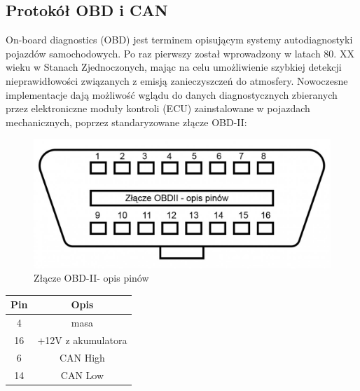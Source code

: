 \documentclass[10pt,a4paper]{scrartcl}
\begin{document}
		\subsection{Protokół OBD i CAN}
		On-board diagnostics (OBD) jest terminem opisującym systemy autodiagnostyki pojazdów samochodowych. Po raz pierwszy został wprowadzony w latach 80. XX wieku w Stanach Zjednoczonych, mając na celu umożliwienie szybkiej detekcji nieprawidłowości związanych z emisją zanieczyszczeń do atmosfery.  Nowoczesne implementacje dają możliwość wglądu do danych diagnostycznych zbieranych przez elektroniczne moduły kontroli (ECU) zainstalowane w pojazdach mechanicznych, poprzez standaryzowane złącze OBD-II:
		\begin{figure}[H]
			\centering
			\includegraphics[width=0.7\linewidth]{obd2}
			\caption[Złącze OBD-II]{Złącze OBD-II- opis pinów}
			\label{fig:obd2}
		\end{figure}
		\begin{table}[H]
		\begin{tabular}{|c|c|}
			\hline
			Pin & Opis \\
			\hline
			4 & masa \\
			\hline
			16 & +12V z akumulatora \\
				\hline
			6 & CAN High \\			
				\hline
			14 & CAN Low \\			
			\hline
		\end{tabular}
		\end{table}
		
\end{document}
